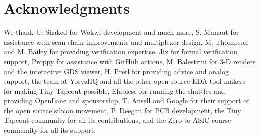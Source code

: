 \section*{Acknowledgments}
\label{sec:acknowledgements}

We thank U. Shaked for Wokwi development and much more, S. Munaut for assistance with scan chain improvements and multiplexer design, M. Thompson and M. Bailey for providing verification expertise, Jix for formal verification support, Proppy for assistance with GitHub actions, M. Balestrini for 3-D renders and the interactive GDS viewer, H. Pretl for providing advice and analog support, the team at YosysHQ and all the other open source EDA tool makers for making Tiny Tapeout possible, Efabless for running the shuttles and providing OpenLane and sponsorship, T. Ansell and Google for their support of the open source silicon movement, P. Deegan for PCB development, the Tiny Tapeout community for all its contributions, and the Zero to ASIC course community for all its support.
